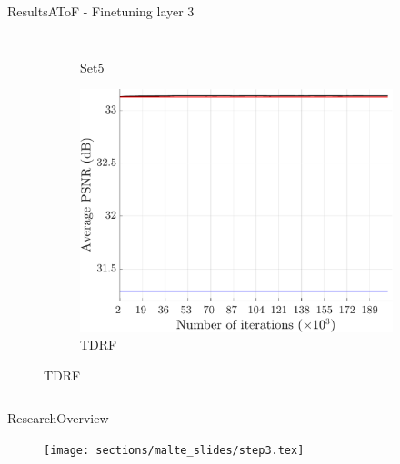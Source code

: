 \begin{frame}{Results}{AToF - Finetuning layer 3}
\begin{columns}
\begin{figure}
\begin{subfigure}[b]{0.48\textwidth}
                \vspace*{-2mm}
                \caption*{\scriptsize Set5}
            \end{subfigure}
            \begin{subfigure}[b]{0.48\textwidth}
                \includegraphics[width=\textwidth]{sections/malte_slides/atof-l3-results-tdrf.pdf}
                \vspace*{-2mm}
                \caption*{\scriptsize TDRF}
            \end{subfigure}
        \end{figure}

    \end{columns}
\end{frame}

\begin{frame}{Research}{Overview}
    \begin{figure}
        \centering
        \texttt{[image: sections/malte\_slides/step3.tex]}
    \end{figure}
\end{frame}

